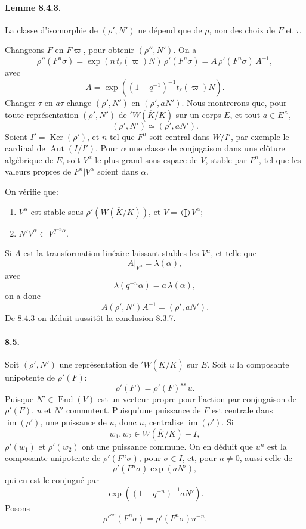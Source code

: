 \documentclass[10pt]{article}
\providecommand{\Ker}{\operatorname{Ker}}
\providecommand{\im}{\operatorname{im}}
\providecommand{\Aut}{\operatorname{Aut}}
\providecommand{\End}{\operatorname{End}}
\providecommand{\im}{\operatorname{im}}
\providecommand{\im}{\operatorname{im}}
\providecommand{\End}{\operatorname{End}}
\providecommand{\Ker}{\operatorname{Ker}}
\begin{document}
\paragraph{Lemme 8.4.3.} La classe d'isomorphie de \((\rho',N')\) ne dépend que de \(\rho\), non des choix de \(F\) et \(\tau\).

Changeons \(F\) en \(F\varpi\), pour obtenir \((\rho'',N')\). On a
\[
\rho''(F^n\sigma)=
\exp(n\,t_\ell(\varpi)N)\,\rho'(F^n\sigma)
=
A\,\rho'(F^n\sigma)\,A^{-1},
\]
avec
\[
A=\exp((1-q^{-1})^{-1}t_\ell(\varpi)N).
\]
Changer \(\tau\) en \(a\tau\) change \((\rho',N')\) en \((\rho',aN')\). Nous montrerons que, pour toute représentation \((\rho',N')\) de \({}'W(\overline K/K)\) sur un corps \(E\), et tout \(a\in E^\times\),
\[
(\rho',N')\simeq(\rho',aN').
\]
Soient \(I'=\Ker(\rho')\), et \(n\) tel que \(F^n\) soit central dans \(W/I'\), par exemple le cardinal de \(\Aut(I/I')\). Pour \(\alpha\) une classe de conjugaison dans une clôture algébrique de \(E\), soit \(V^\alpha\) le plus grand sous-espace de \(V\), stable par \(F^n\), tel que les valeurs propres de \(F^n|V^\alpha\) soient dans \(\alpha\).

On vérifie que:
\begin{enumerate}[label=(\alph*)]
\item \(V^\alpha\) est stable sous \(\rho'(W(\overline K/K))\), et \(V=\bigoplus V^\alpha\);
\item \(N' V^\alpha\subset V^{q^{-n}\alpha}\).
\end{enumerate}
Si \(A\) est la transformation linéaire laissant stables les \(V^\alpha\), et telle que
\[
A|_{V^\alpha}=\lambda(\alpha),
\]
avec
\[
\lambda(q^{-n}\alpha)=a\,\lambda(\alpha),
\]
on a donc
\[
A(\rho',N')A^{-1}=(\rho',aN').
\]
De 8.4.3 on déduit aussitôt la conclusion 8.3.7.

\paragraph{8.5.} Soit \((\rho',N')\) une représentation de \({}'W(\overline K/K)\) sur \(E\). Soit \(u\) la composante unipotente de \(\rho'(F)\):
\[
\rho'(F)=\rho'(F)^{ss}\,u.
\]
Puisque \(N'\in\End(V)\) est un vecteur propre pour l'action par conjugaison de \(\rho'(F)\), \(u\) et \(N'\) commutent. Puisqu'une puissance de \(F\) est centrale dans \(\im(\rho')\), une puissance de \(u\), donc \(u\), centralise \(\im(\rho')\). Si
\[
w_1,w_2\in W(\overline K/K)-I,
\]
\(\rho'(w_1)\) et \(\rho'(w_2)\) ont une puissance commune. On en déduit que \(u^n\) est la composante unipotente de \(\rho'(F^n\sigma)\), pour \(\sigma\in I\), et, pour \(n\ne0\), aussi celle de
\[
\rho'(F^n\sigma)\exp(aN'),
\]
qui en est le conjugué par
\[
\exp((1-q^{-n})^{-1}aN').
\]
Posons
\[
\tag{8.5.1}
\rho'^{ss}(F^n\sigma)=\rho'(F^n\sigma)u^{-n}.
\]
\end{document}
